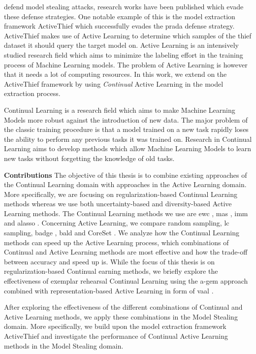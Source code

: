 defend model stealing attacks, research works have been published which evade these defense strategies. One notable example of this is the model
extraction framework ActiveThief \cite{pal2020activethief} which successfully evades the \gls{prada} defense strategy. ActiveThief makes use of Active
Learning to determine which samples of the thief dataset it should query the target model on. Active Learning is an intensively studied research
field which aims to minimize the labeling effort in the training process of Machine Learning models. The problem of Active Learning is however that it
needs a lot of computing resources. In this work, we extend on the ActiveThief framework by using \textit{Continual} Active Learning in the model
extraction process.\par
Continual Learning is a research field which aims to make Machine Learning Models more robust against the introduction of new data. The major problem
of the classic training procedure is that a model trained on a new task rapidly loses the ability to perform any previous tasks it was trained on.
Research in Continual Learning aims to develop methods which allow Machine Learning Models to learn new tasks without forgetting the knowledge of old 
tasks. \par
\textbf{Contributions} \hspace{0.2cm} The objective of this thesis is to combine existing approaches of the Continual Learning domain
 with approaches in the Active Learning domain. More specifically, we are focusing on regularization-based Continual Learning methods
whereas we use both uncertainty-based and diversity-based Active Learning methods. The Continual Learning methods we use are \gls{ewc} \cite{kirkpatrick2017overcoming},
\gls{mas} \cite{aljundi2018memory}, \gls{imm} \cite{lee2017overcoming} and \gls{alasso} \cite{park2019continual}.
Concerning Active Learning, we compare random sampling, \gls{lc} \cite{lewis1994sequential} sampling, \gls{badge} \cite{ash2019deep}, \gls{bald} \cite{houlsby2011bayesian} and
CoreSet \cite{sener2017active}.
We analyze how the Continual Learning methods can speed up the Active Learning process, which combinations of Continual and Active Learning methods
are most effective and how the trade-off between accuracy and speed up is. While the focus of this thesis is on regularization-based Continual
earning methods, we briefly explore the effectiveness of exemplar rehearsal Continual Learning using the \gls{a-gem} approach \cite{chaudhry2018efficient}
combined with representation-based Active Learning in form of \gls{vaal} \cite{sinha2019variational}. \par
After exploring the effectiveness of the different combinations of Continual and Active Learning methods, we apply these combinations in the Model Stealing
domain. More specifically, we build upon the model extraction framework ActiveThief \cite{pal2020activethief} and investigate the performance of Continual
Active Learning methods in the Model Stealing domain.
